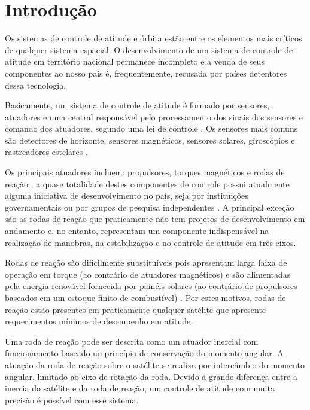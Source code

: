 \cleardoublepage

\pagestyle{fancy}


\chapter{Introdução}\label{intro}

Os sistemas de controle de atitude e órbita estão entre os elementos mais críticos de qualquer sistema espacial. O desenvolvimento de um sistema de controle de atitude em território nacional permanece incompleto \citep{Veloso2009} e a venda de seus componentes ao nosso país é, frequentemente, recusada por países detentores dessa tecnologia.

Basicamente, um sistema de controle de atitude é formado por sensores, atuadores e uma central responsável pelo processamento dos sinais dos sensores e comando dos atuadores, segundo uma lei de controle \citep{Rycroft1992}. Os sensores mais comuns são detectores de horizonte, sensores magnéticos, sensores solares, giroscópios e rastreadores estelares \citep{Larson1999}. 

Os principais atuadores incluem: propulsores, torques magnéticos e rodas de reação \citep{Larson1999}, a quase totalidade destes componentes de controle possui atualmente alguma iniciativa de desenvolvimento no país, seja por instituições governamentais ou por grupos de pesquisa independentes \citep{PresidenciaRepublica}. A principal exceção são as rodas de reação que praticamente não tem projetos de desenvolvimento em andamento e, no entanto, representam um componente indispensável na realização de manobras, na estabilização e no controle de atitude em três eixos. 

Rodas de reação são dificilmente substituíveis pois apresentam larga faixa de operação em torque (ao contrário de atuadores magnéticos) e são alimentadas pela energia renovável fornecida por painéis solares (ao contrário de propulsores baseados em um estoque finito de combustível) \citep{Ismail2010}. Por estes motivos, rodas de reação estão presentes em praticamente qualquer satélite que apresente requerimentos mínimos de desempenho em atitude.

Uma roda de reação pode ser descrita como um atuador inercial com funcionamento baseado no princípio de conservação do momento angular. A atuação da roda de reação sobre o satélite se realiza por intercâmbio do momento angular, limitado ao eixo de rotação da roda. Devido à grande diferença entre a inercia do satélite e da roda de reação, um controle de atitude com muita precisão é possível com esse sistema.

